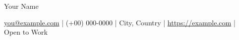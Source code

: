 \newcommand{\resumeName}{Your Name}
\newcommand{\resumeEmail}{you@example.com}
\newcommand{\resumePhone}{(+00) 000-0000}
\newcommand{\resumeLocation}{City, Country}
\newcommand{\resumeStatus}{Open to Work}
\newcommand{\resumeWebsite}{https://example.com}

{\fontsize{22pt}{24pt}\selectfont \resumeName\par}
\vspace{5pt}
{\normalsize
\href{mailto:\resumeEmail}{\resumeEmail}
\hspace{5pt}|\hspace{5pt}
\resumePhone
\hspace{5pt}|\hspace{5pt}
\resumeLocation
\hspace{5pt}|\hspace{5pt}
\href{\resumeWebsite}{\resumeWebsite}
\hspace{5pt}|\hspace{5pt}
\resumeStatus\par}
\vspace{8pt}
